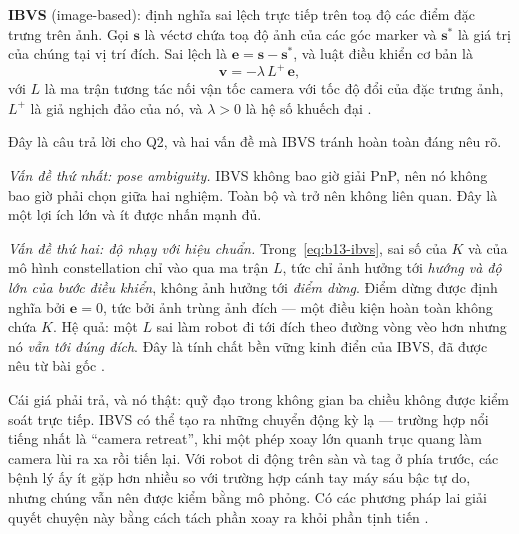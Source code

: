 \documentclass[../../marker.tex]{subfiles}
\begin{document}
\textbf{IBVS} (image-based): định nghĩa sai lệch trực tiếp trên toạ độ các điểm đặc trưng trên ảnh. Gọi \(\mathbf{s}\) là véctơ chứa toạ độ ảnh của các góc marker và \(\mathbf{s}^*\) là giá trị của chúng tại vị trí đích. Sai lệch là \(\mathbf{e} = \mathbf{s} - \mathbf{s}^*\), và luật điều khiển cơ bản là
\begin{equation}
\mathbf{v} = -\lambda\,L^{+}\,\mathbf{e},
\label{eq:b13-ibvs}
\end{equation}
với \(L\) là ma trận tương tác nối vận tốc camera với tốc độ đổi của đặc trưng ảnh, \(L^{+}\) là giả nghịch đảo của nó, và \(\lambda > 0\) là hệ số khuếch đại \cite[§II]{chaumette2006visual1}.

Đây là câu trả lời cho Q2, và hai vấn đề mà IBVS tránh hoàn toàn đáng nêu rõ.

\emph{Vấn đề thứ nhất: pose ambiguity.} IBVS không bao giờ giải PnP, nên nó không bao giờ phải chọn giữa hai nghiệm. Toàn bộ  và  trở nên không liên quan. Đây là một lợi ích lớn và ít được nhấn mạnh đủ.

\emph{Vấn đề thứ hai: độ nhạy với hiệu chuẩn.} Trong~\eqref{eq:b13-ibvs}, sai số của \(K\) và của mô hình constellation chỉ vào qua ma trận \(L\), tức chỉ ảnh hưởng tới \emph{hướng và độ lớn của bước điều khiển}, không ảnh hưởng tới \emph{điểm dừng}. Điểm dừng được định nghĩa bởi \(\mathbf{e} = 0\), tức bởi ảnh trùng ảnh đích --- một điều kiện hoàn toàn không chứa \(K\). Hệ quả: một \(L\) sai làm robot đi tới đích theo đường vòng vèo hơn nhưng nó \emph{vẫn tới đúng đích}. Đây là tính chất bền vững kinh điển của IBVS, đã được nêu từ bài gốc \cite{espiau1992new}.

Cái giá phải trả, và nó thật: quỹ đạo trong không gian ba chiều không được kiểm soát trực tiếp. IBVS có thể tạo ra những chuyển động kỳ lạ --- trường hợp nổi tiếng nhất là ``camera retreat'', khi một phép xoay lớn quanh trục quang làm camera lùi ra xa rồi tiến lại. Với robot di động trên sàn và tag ở phía trước, các bệnh lý ấy ít gặp hơn nhiều so với trường hợp cánh tay máy sáu bậc tự do, nhưng chúng vẫn nên được kiểm bằng mô phỏng. Có các phương pháp lai giải quyết chuyện này bằng cách tách phần xoay ra khỏi phần tịnh tiến \cite{malis1999twohalf,chaumette2007visual2}.
\end{document}
